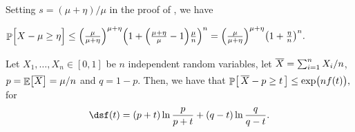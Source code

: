 \begin{remark}
    Setting $s = (\mu + \eta)/\mu$ in the proof of
    , we have

    \medskip%
    \centerline{%
    \begin{math}
        \Prob{\Bigl.X - \mu \geq \eta }%
        \leq %
        \pth{\frac{\mu}{\mu + \eta}}^{\mu + \eta}%
        \pth{1 + \pth{\frac{\mu + \eta}{\mu}-1} \frac{\mu}{n}}^n%
        = %
        \pth{\frac{\mu}{\mu + \eta}}^{\mu + \eta} \pth{1 +
           \frac{\eta}{n}}^n.
    \end{math}%
 }
\end{remark}


\begin{corollary}
    Let $X_1, \ldots, X_n \in [0,1]$ be $n$ independent random
    variables, let $\Bigl.\overline{X} = \sum_{i=1}^n X_i/n$,
    $p = \mathop{\mathbb{E}}\!\left[ {\overline{X}} \right] = \mu/n$ and $q = 1-p$. Then, we have that
    \begin{math}
        \ds%
        \Prob{\bigl.\, \overline{X} - p \geq t \, }%
        \leq%
        \exp\pth{ \bigl. nf(t)},
    \end{math}
    for
    \begin{align}
        \eqlab{f:t:cher}%
        \ds%
        f(t) = (p+t)\ln \frac{p}{p+t} + (q-t)\ln \frac{q}{q-t}.
    \end{align}%
\end{corollary}

